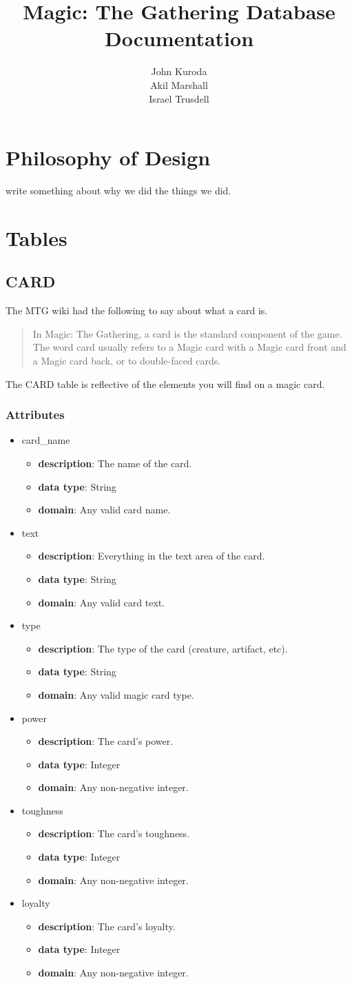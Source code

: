 \documentclass{article}
\title{Magic: The Gathering Database Documentation}
\author{John Kuroda\\Akil Marshall\\Israel Trusdell}
\newcommand{\tablesection}[2] {
    \subsection{#1}  %
    #2  %
    \subsubsection{Attributes}
}
\newcommand{\attribute}[4] {
    \begin{itemize}
        \item {#1}  %
            \begin{itemize}
                \item \textbf{description}: #2  %
                \item \textbf{data type}: #3  %
                \item \textbf{domain}: #4  %
            \end{itemize}
    \end{itemize}
}
\begin{document}
\maketitle
\newpage
\tableofcontents
\newpage
\section{Philosophy of Design}
write something about why we did the things we did.

\section{Tables}
\tablesection{CARD}{
    The MTG wiki had the following to say about what a card is.
    \begin{quote}
        In Magic: The Gathering, a card is the standard component of the game. The word card usually refers to a Magic card with a Magic card front and a Magic card back, or to double-faced cards.
    \end{quote}

    The CARD table is reflective of the elements you will find on a magic card.
}
\attribute{card\_name}{The name of the card.}{String}{Any valid card name.}
\attribute{text}{Everything in the text area of the card.}{String}{Any valid card text.}
\attribute{type}{The type of the card (creature, artifact, etc).}{String}{Any valid magic card type.}
\attribute{power}{The card's power.}{Integer}{Any non-negative integer.}
\attribute{toughness}{The card's toughness.}{Integer}{Any non-negative integer.}
\attribute{loyalty}{The card's loyalty.}{Integer}{Any non-negative integer.}
\end{document}
